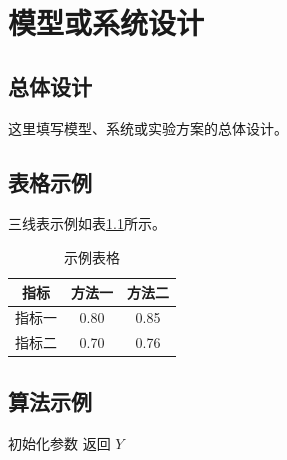 
\chapter{模型或系统设计}
\label{ch:design}

\section{总体设计}

这里填写模型、系统或实验方案的总体设计。

\section{表格示例}

三线表示例如表\ref{tab:sample}所示。
\begin{table}[htbp]
  \centering
  \caption{示例表格}
  \label{tab:sample}
  \begin{tabular}{ccc}
    \toprule
    指标 & 方法一 & 方法二 \\
    \midrule
    指标一 & 0.80 & 0.85 \\
    指标二 & 0.70 & 0.76 \\
    \bottomrule
  \end{tabular}
\end{table}

\section{算法示例}

\begin{algorithm}[htbp]
  \caption{示例算法}
  初始化参数\;
  返回 $Y$\;
\end{algorithm}
